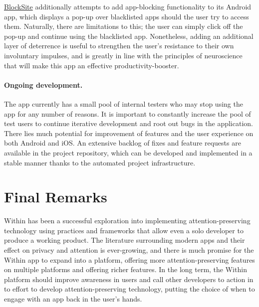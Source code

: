\href{https://blocksite.co/}{BlockSite} additionally attempts to add app-blocking functionality to its Android app, which displays a pop-up over blacklisted apps should the user try to access them. Naturally, there are limitations to this; the user can simply click off the pop-up and continue using the blacklisted app. Nonetheless, adding an additional layer of deterrence is useful to strengthen the user's resistance to their own involuntary impulses, and is greatly in line with the principles of neuroscience that will make this app an effective productivity-booster.

\paragraph{Ongoing development.} The app currently has a small pool of internal testers who may stop using the app for any number of reasons. It is important to constantly increase the pool of test users to continue iterative development and root out bugs in the application. There lies much potential for improvement of features and the user experience on both Android and iOS. An extensive backlog of fixes and feature requests are available in the project repository, which can be developed and implemented in a stable manner thanks to the automated project infrastructure.


\section{Final Remarks}
Within has been a successful exploration into implementing attention-preserving technology using practices and frameworks that allow even a solo developer to produce a working product. The literature surrounding modern apps and their effect on privacy and attention is ever-growing, and there is much promise for the Within app to expand into a platform, offering more attention-preserving features on multiple platforms and offering richer features. In the long term, the Within platform should improve awareness in users and call other developers to action in to effort to develop attention-preserving technology, putting the choice of when to engage with an app back in the user's hands.